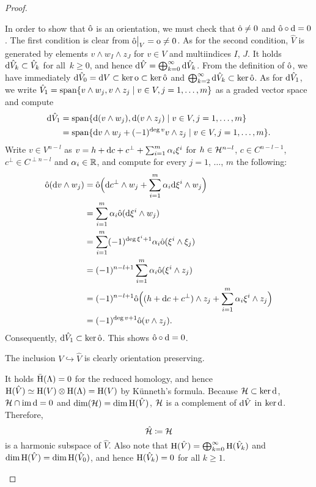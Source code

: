 \documentclass[\MainFolder/Text.tex]{subfiles}
\begin{document}
\begin{proof}
\begin{description}[leftmargin=0pt,font=\normalfont\itshape]
In order to show that $\hat{\mathrm{o}}$ is an orientation, we must check that $\hat{\mathrm{o}}\neq 0$ and $\hat{\mathrm{o}}\circ \mathrm{d} = 0$.
The first condition is clear from $\Restr{\hat{\Or}}{V} = \Or \neq 0$. 
As for the second condition, $\hat{V}$ is generated by elements $v \wedge w_I \wedge z_J$ for $v\in V$ and multiindices $I$, $J$.
It holds $\mathrm{d} \hat{V}_k \subset \hat{V}_k$ for all~$k\ge 0$, and hence $\mathrm{d} \hat{V} = \bigoplus_{k=0}^\infty \mathrm{d} \hat{V}_k$.
From the definition of $\hat{\mathrm{o}}$, we have immediately $\mathrm{d} \hat{V}_0 = \mathrm{d} V \subset \ker \mathrm{o} \subset \ker \hat{\mathrm{o}}$ and $\bigoplus_{k=2}^\infty \mathrm{d} \hat{V}_k \subset \ker\hat{\mathrm{o}}$.
As for $\mathrm{d}\hat{V}_1$, we write $\hat{V}_{1} = \mathrm{span} \{v\wedge w_j, v\wedge z_j \mid v\in V, j=1,\dotsc, m\}$ as a graded vector space and compute
\begin{equation}\label{Eq:DVI}
\begin{aligned}
	\mathrm{d} \hat{V}_1 &= \mathrm{span}\{\mathrm{d}(v\wedge w_j), \mathrm{d}(v\wedge z_j) \mid v\in V, j=1, \dotsc, m \}\\
	&=\mathrm{span}\{\mathrm{d} v \wedge w_j + (-1)^{\operatorname{deg} v} v \wedge z_j \mid v\in V, j=1, \dotsc, m\}.
\end{aligned}
\end{equation}
Write $v\in V^{n-l}$ as $v = h  + \mathrm{d} c + c^\perp + \sum_{i=1}^m \alpha_i \xi^i$ for $h\in \mathcal{H}^{n-l}$, $c\in C^{n-l-1}$, $c^\perp\in C^{\perp n-l}$ and $\alpha_i\in \mathbb{R}$, and compute for every $j=1$, $\dotsc$, $m$ the following:
\begin{align*}
\hat{\mathrm{o}}(\mathrm{d} v\wedge w_j) & = \hat{\mathrm{o}}\Bigl(\mathrm{d} c^\perp \wedge w_j + \sum_{i=1}^m \alpha_i \mathrm{d} \xi^i \wedge w_j\Bigr)\\
&= \sum_{i=1}^m \alpha_i \hat{\mathrm{o}}(\mathrm{d} \xi^i \wedge w_j)\\
&= \sum_{i=1}^m (-1)^{\deg \xi^i + 1}\alpha_i \hat{\mathrm{o}}(\xi^i \wedge \xi_j) \\
&= (-1)^{n-l+1}\sum_{i=1}^m \alpha_i \hat{\mathrm{o}}(\xi^i \wedge z_j)\\
&= (-1)^{n-l+1}\hat{\mathrm{o}}\Bigl((h + \mathrm{d} c + c^\perp)\wedge z_j +\sum_{i=1}^m \alpha_i \xi^i \wedge z_j \Bigr) \\
&= (-1)^{\deg v + 1}\hat{\mathrm{o}}(v\wedge z_j).
\end{align*}
Consequently, $\mathrm{d} \hat{V}_{1}\subset \ker \hat{\mathrm{o}}$.
This shows $\hat{\mathrm{o}}\circ\mathrm{d} = 0$.

The inclusion $V\hookrightarrow\hat{V}$ is clearly orientation preserving. 

\item[Construction of $\hat{\Harm}$:]
It holds $\bar{\mathrm{H}}(\Lambda) = 0$ for the reduced homology, and hence $\mathrm{H}(\hat{V}) \simeq \mathrm{H}(V)\otimes\mathrm{H}(\Lambda) = \mathrm{H}(V)$ by K\"unneth's formula. Because $\mathcal{H}\subset \ker \mathrm{d}$, $\mathcal{H}\cap\operatorname{im}\mathrm{d} = 0$ and $\dim(\mathcal{H}) = \dim \mathrm{H}(\hat{V})$, $\mathcal{H}$ is a complement of $\mathrm{d}\hat{V}$ in $\ker \mathrm{d}$. Therefore, 
\[
\hat{\mathcal{H}} \coloneqq \mathcal{H}
\]
is a harmonic subspace of $\hat{V}$.
Also note that $\mathrm{H}(\hat{V})=\bigoplus_{k=0}^\infty \mathrm{H}(\hat{V}_k)$ and $\dim \mathrm{H}(\hat{V}) = \dim \mathrm{H}(\hat{V}_0)$, and hence $\mathrm{H}(\hat{V}_k) = 0$ for all $k\ge 1$.


\end{description}
\end{proof}
\end{document}
